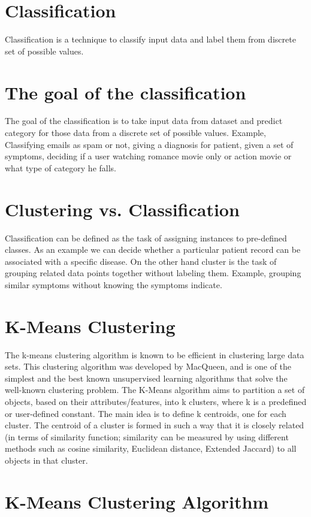 \documentclass[document.tex]{subfiles}
\begin{document}
\section{Classification}
Classification is a technique to classify input data and label them from discrete set of possible values.
\section{The goal of the classification}
The goal of the classification is to take input data from dataset and predict category for those data from a discrete set of possible values.
Example, Classifying emails as spam or not, giving a diagnosis for patient, given a set of symptoms, deciding if a user watching romance movie only or action movie or what type of category he falls. 

\section{Clustering vs. Classification}
Classification can be defined as the task of assigning instances to pre-defined classes. As an example we can decide whether a particular patient record can be associated with a specific disease. On the other hand cluster is the task of grouping related data points together without labeling them. Example, grouping similar symptoms without knowing the symptoms indicate.
\section{K-Means Clustering}
The k-means clustering algorithm is known to be efficient in clustering large data sets. This clustering algorithm was developed by MacQueen, and is one of the simplest and the best known unsupervised learning algorithms that solve the well-known clustering problem. The K-Means algorithm aims to partition a set of objects, based on their attributes/features, into k clusters, where k is a predefined or user-defined constant. The main idea is to define k centroids, one for each cluster. The centroid of a cluster is formed in such a way that it is closely related (in terms of similarity function; similarity can be measured by using different methods such as cosine similarity, Euclidean distance, Extended Jaccard) to all objects in that cluster.
\section{K-Means Clustering Algorithm}
\end{document}
